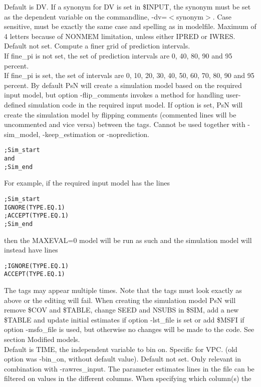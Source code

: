 \begin{optionlist}
Default is DV. If a synonym for DV is set in \mbox{\$INPUT}, the synonym must be set as the dependent variable on the commandline, -dv=$<$synonym$>$. 
Case sensitive, must be exactly the same case and spelling as in modelfile. Maximum of 4 letters because of NONMEM limitation, unless either IPRED or IWRES.
\nextopt
{}
Default not set. Compute a finer grid of prediction intervals.\\ If fine\_pi is not set, the set of prediction intervals are 0, 40, 80, 90 and 95 percent.\\ 
If fine\_pi is set, the set of intervals are 0, 10, 20, 30, 40, 50, 60, 70, 80, 90 and 95 percent.
\nextopt
{}
By default PsN will create a simulation model based on the  required input model, but option -flip\_comments invokes a method for handling user-defined simulation code in the required input model. If option is set, PsN will create the simulation model by flipping comments (commented lines will be uncommented and vice versa) between the tags.
Cannot be used together with -sim\_model, -keep\_estimation or -noprediction.
\begin{verbatim}
;Sim_start
and 
;Sim_end
\end{verbatim}
For example, if the required input model has the lines
\begin{verbatim}
;Sim_start 
IGNORE(TYPE.EQ.1)
;ACCEPT(TYPE.EQ.1) 
;Sim_end
\end{verbatim}
then the MAXEVAL=0 model will be run as such and the simulation model will instead have lines
\begin{verbatim}
;IGNORE(TYPE.EQ.1)
ACCEPT(TYPE.EQ.1) 
\end{verbatim}
The tags may appear multiple times. Note that the tags must look exactly  as above or the editing will fail. When creating the simulation model PsN will remove \$COV and \$TABLE, change SEED and NSUBS in \$SIM, add a new \$TABLE and  update initial estimates if option -lst\_file is set or add \$MSFI if option -msfo\_file is used, but otherwise no changes will be made to the code. See section Modified models.\\
\nextopt
{}
Default is TIME, the independent variable to bin on. Specific for VPC. (old  option was -bin\_on, without default value). 
\nextopt
{}
Default not set. Only relevant in combination with -rawres\_input.  
The parameter estimates lines in the file can be filtered on values in the different columns. When specifying which column(s) the 

\end{optionlist}
